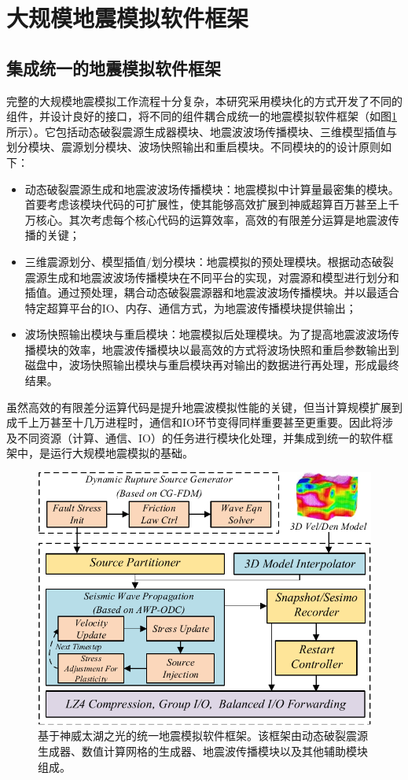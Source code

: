 \documentclass[degree=doctor]{thuthesis}
\begin{document}
\section{大规模地震模拟软件框架} %
\label{sec:大规模地震模拟软件框架}

\subsection{集成统一的地震模拟软件框架}
完整的大规模地震模拟工作流程十分复杂，本研究采用模块化的方式开发了不同的组件，并设计良好的接口，将不同的组件耦合成统一的地震模拟软件框架（如图\ref{fig:framework}所示）。它包括动态破裂震源生成器模块、地震波波场传播模块、三维模型插值与划分模块、震源划分模块、波场快照输出和重启模块。不同模块的的设计原则如下：
\begin{itemize}
  \item 动态破裂震源生成和地震波波场传播模块：地震模拟中计算量最密集的模块。首要考虑该模块代码的可扩展性，使其能够高效扩展到神威超算百万甚至上千万核心。其次考虑每个核心代码的运算效率，高效的有限差分运算是地震波传播的关键；
  \item 三维震源划分、模型插值/划分模块：地震模拟的预处理模块。根据动态破裂震源生成和地震波波场传播模块在不同平台的实现，对震源和模型进行划分和插值。通过预处理，耦合动态破裂震源器和地震波波场传播模块。并以最适合特定超算平台的IO、内存、通信方式，为地震波传播模块提供输出；
  \item 波场快照输出模块与重启模块：地震模拟后处理模块。为了提高地震波波场传播模块的效率，地震波传播模块以最高效的方式将波场快照和重启参数输出到磁盘中，波场快照输出模块与重启模块再对输出的数据进行再处理，形成最终结果。
\end{itemize}

虽然高效的有限差分运算代码是提升地震波模拟性能的关键，但当计算规模扩展到成千上万甚至十几万进程时，通信和IO环节变得同样重要甚至更重要。因此将涉及不同资源（计算、通信、IO）的任务进行模块化处理，并集成到统一的软件框架中，是运行大规模地震模拟的基础。

\begin{figure}[ht]
\centering
\includegraphics[width=0.9\columnwidth]{architecture.pdf}
\caption{基于神威太湖之光的统一地震模拟软件框架。该框架由动态破裂震源生成器、数值计算网格的生成器、地震波传播模块以及其他辅助模块组成。}
\label{fig:framework}
\end{figure}
\end{document}
